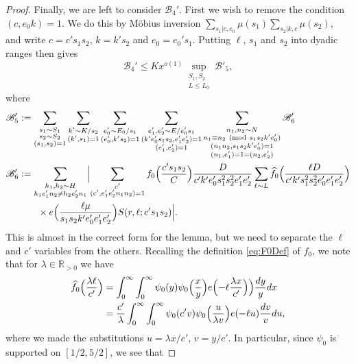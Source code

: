 \documentclass[10pt]{amsart}
\theoremstyle{plain}
\numberwithin{equation}{section}
\newcommand{\Mod}[1]{\ (\mathrm{mod}\ #1)}
\renewcommand{\hat}[1]{\widehat #1}
\begin{document}
\begin{proof}
Finally, we are left to consider $\mathscr{B}_4'$. First we wish to remove the condition $(c,e_0k)=1$. We do this by M\"obius inversion $\sum_{s_1|c,e_0}\mu(s_1)\sum_{s_2|k,c}\mu(s_2)$, and write $c=c' s_1 s_2$, $k=k' s_2$ and $e_0=e_0's_1$. Putting $\ell$, $s_1$ and $s_2$ into dyadic ranges then gives 
\[
\mathscr{B}_4'\le K x^{o(1)}\sup_{\substack{S_1,S_2\\ L\le L_0}}\mathscr{B}'_5,
\]
where
\begin{align*}
\mathscr{B}'_5&:=\sum_{\substack{s_1\sim S_1\\ s_2\sim S_2\\ (s_1,s_2)=1}}\sum_{\substack{k'\sim K/s_2\\ (k',s_1)=1}}\sum_{\substack{e_0'\sim E_0/s_1\\ (e_0',k' s_2)=1}}\sum_{\substack{e_1',e_2'\sim E/e_0's_1\\ (k' e_0's_1s_2,e_1'e_2')=1\\(e_1',e_2')=1}}\sum_{\substack{n_1,n_2\sim N\\ n_1\equiv n_2\Mod{s_1s_2 k' e_0'}\\ (n_1n_2, s_1s_2k' e_0')=1\\ (n_1,e_1')=1=(n_2,e_2')}}\mathscr{B}_6'\\
\mathscr{B}_6'&:=\sum_{\substack{h_1,h_2\sim H\\ h_1e_1'n_2\ne h_2e_2'n_1}}\Bigl|\sum_{\substack{c'\\ (c',e_1'e_2'n_1n_2)=1}}f_0\Bigl(\frac{c' s_1 s_2}{C}\Bigr)\frac{D}{c' k' e_0' s_1^2s_2^2 e_1'e_2'}\sum_{\ell\sim L}\hat{f_0}\Bigl(\frac{\ell D}{c' k' s_1^2s_2^2 e_0'e_1'e_2'}\Bigr)\\
&\qquad\times e\Bigl(\frac{\ell\mu}{s_1s_2k' e_0'e_1'e_2'}\Bigr)S(r,\ell;c's_1s_2)\Bigr|.
\end{align*}
This is almost in the correct form for the lemma, but we need to separate the $\ell$ and $c'$ variables from the others. Recalling the definition \eqref{eq:F0Def} of $f_0$, we note that for $\lambda\in\mathbb{R}_{>0}$ we have
\begin{align*}
\hat{f_0}\Bigl(\frac{\lambda\ell}{c'}\Bigr)&=\int_{0}^{\infty}\int_{0}^{\infty}\psi_0(y)\psi_0\Bigl(\frac{x}{y}\Bigr)e\Bigl(-\ell\frac{\lambda x}{c'}\Bigr)\Bigr)\frac{dy}{y}dx\\
&=\frac{c'}{\lambda}\int_{0}^{\infty}\int_{0}^{\infty}\psi_0(c' v)\psi_0\Bigl(\frac{u}{\lambda v}\Bigr)e(-\ell u)\frac{dv}{v}du,
\end{align*}
where we made the substitutions $u=\lambda x/c'$, $v=y/c'$. In particular, since $\psi_0$ is supported on $[1/2,5/2]$, we see that

\end{proof}
\end{document}
